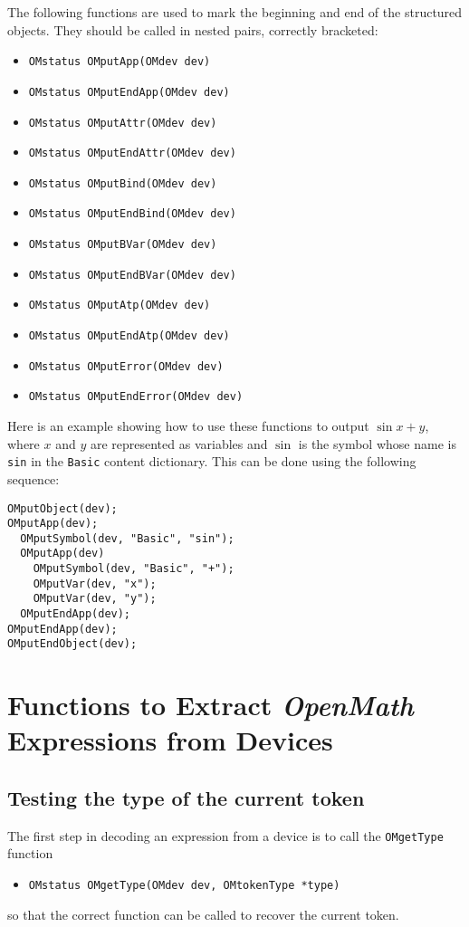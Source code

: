 \documentclass{article}
\newcommand{\OM}{{\sl OpenMath}}
\begin{document}
The following functions are used to mark the beginning and end of the
structured objects. They should be called in nested pairs, correctly
bracketed:  
\begin{itemize} 
\item \verb+OMstatus OMputApp(OMdev dev)+
\item \verb+OMstatus OMputEndApp(OMdev dev)+
\item \verb+OMstatus OMputAttr(OMdev dev)+
\item \verb+OMstatus OMputEndAttr(OMdev dev)+
\item \verb+OMstatus OMputBind(OMdev dev)+
\item \verb+OMstatus OMputEndBind(OMdev dev)+
\item \verb+OMstatus OMputBVar(OMdev dev)+
\item \verb+OMstatus OMputEndBVar(OMdev dev)+
\item \verb+OMstatus OMputAtp(OMdev dev)+
\item \verb+OMstatus OMputEndAtp(OMdev dev)+
\item \verb+OMstatus OMputError(OMdev dev)+
\item \verb+OMstatus OMputEndError(OMdev dev)+
\end{itemize} 

Here is an example showing how to use these functions to output $\sin x + y$,
where $x$ and $y$ are represented as variables and $\sin$ is the symbol whose
name is {\tt sin} in the {\tt Basic} content dictionary. This can be done
using the following sequence:
\begin{verbatim} 
OMputObject(dev);
OMputApp(dev);
  OMputSymbol(dev, "Basic", "sin");
  OMputApp(dev)
    OMputSymbol(dev, "Basic", "+");
    OMputVar(dev, "x");
    OMputVar(dev, "y");
  OMputEndApp(dev);
OMputEndApp(dev);
OMputEndObject(dev);
\end{verbatim} 


\section{Functions to Extract {\OM} Expressions from Devices}


\subsection{Testing the type of the current token}

The first step in decoding an expression from a device is to call the 
{\tt OMgetType} function
\begin{itemize} 
\item \verb+OMstatus OMgetType(OMdev dev, OMtokenType *type)+
\end{itemize} 
so that the correct function can be called to recover the current token.
\end{document}

